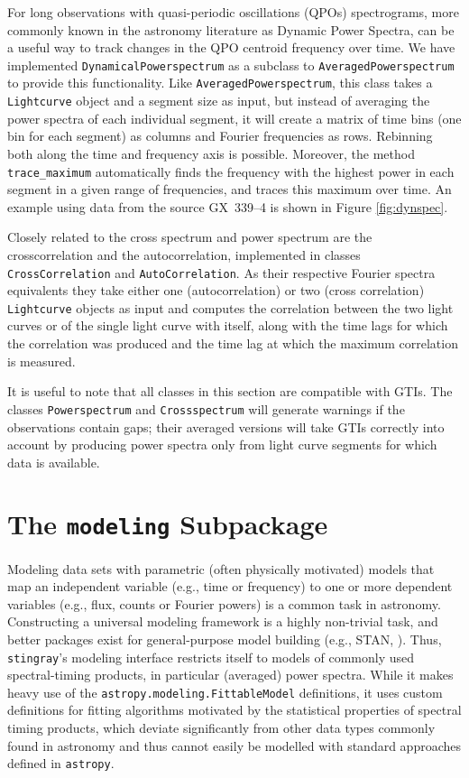 \documentclass[twocolumn]{aastex62}
\newcommand{\stingray}{\texttt{stingray}\xspace}
\newcommand{\lightcurve}{\texttt{Lightcurve}\xspace}
\newcommand{\crossspectrum}{\texttt{Crossspectrum}\xspace}
\newcommand{\powerspectrum}{\texttt{Powerspectrum}\xspace}
\begin{document}
For long observations with quasi-periodic oscillations (QPOs) spectrograms, more commonly known in the astronomy literature as Dynamic Power Spectra, can be a useful way to track changes in the QPO centroid frequency over time. 
We have implemented \texttt{DynamicalPowerspectrum} as a subclass to \texttt{AveragedPowerspectrum} to provide this functionality. 
Like \texttt{AveragedPowerspectrum}, this class takes a \lightcurve object and a segment size as input, but instead of averaging the power spectra of each individual segment, it will create a matrix of time bins (one bin for each segment) as columns and Fourier frequencies as rows. 
Rebinning both along the time and frequency axis is possible. 
Moreover, the method \texttt{trace\_maximum} automatically finds the frequency with the highest power in each segment in a given range of frequencies, and traces this maximum over time. 
An example using data from the source GX~339--4 is shown in Figure \ref{fig:dynspec}.

Closely related to the cross spectrum and power spectrum are the crosscorrelation and the autocorrelation, implemented in classes \texttt{CrossCorrelation} and \texttt{AutoCorrelation}. 
As their respective Fourier spectra equivalents they take either one (autocorrelation) or two (cross correlation) \lightcurve objects as input and computes the correlation between the two light curves or of the single light curve with itself, along with the time lags for which the correlation was produced and the time lag at which the maximum correlation is measured.

It is useful to note that all classes in this section are compatible with GTIs. 
The classes \powerspectrum and \crossspectrum will generate warnings if the observations contain gaps; their averaged versions will take GTIs correctly into account by producing power spectra only from light curve segments for which data is available.  


\section{The \texttt{modeling} Subpackage}
\label{sec:modeling}

Modeling data sets with parametric (often physically motivated) models that map an independent variable (e.g., time or frequency) to one or more dependent variables (e.g., flux, counts or Fourier powers) is a common task in astronomy. 
Constructing a universal modeling framework is a highly non-trivial task, and better packages exist for general-purpose model building (e.g., STAN, \citealt{stan}). 
Thus, \stingray's modeling interface restricts itself to models of commonly used spectral-timing products, in particular (averaged) power spectra. 
While it makes heavy use of the \verb|astropy.modeling.FittableModel| definitions, it uses custom definitions for fitting algorithms motivated by the statistical properties of spectral timing products, which deviate significantly from other data types commonly found in astronomy and thus cannot easily be modelled with standard approaches defined in \texttt{astropy}.
\end{document}
